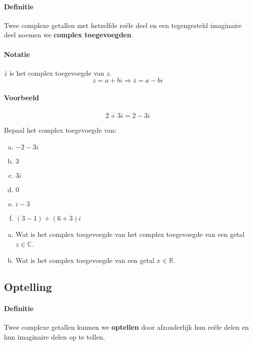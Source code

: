 \documentclass[12pt,twoside]{article}
\begin{document}
\paragraph*{Definitie}
\begin{mdframed}
Twee complexe getallen met hetzelfde reële deel en een tegengesteld imaginaire deel noemen we {\bf complex toegevoegden}.
\end{mdframed}

\paragraph*{Notatie}
$\bar{z}$ is het complex toegevoegde van $z$.
$$z=a+bi \Rightarrow \overline{z}=a-bi$$

\paragraph*{Voorbeeld}
$$\overline{2+3i}=2-3i$$

\begin{oefening}
Bepaal het complex toegevoegde van:
\begin{multicols}{2}
\begin{enumerate}[(a)]
  \item $-2-3i$
  \item $3$
  \item $3i$
  \item $0$
  \item $i-3$
  \item $(3-1)+(6+3)i$
\end{enumerate}  
\end{multicols}
\end{oefening}

\begin{oefening}
\begin{enumerate}[(a)]
  \item Wat is het complex toegevoegde van het complex toegevoegde van een getal $z\in\mathbb{C}$.
  \item Wat is het complex toegevoegde van een getal $x\in\mathbb{R}$.
\end{enumerate}

\end{oefening}

\subsection{Optelling}

\paragraph*{Definitie}
\begin{mdframed}
Twee complexe getallen kunnen we {\bf optellen} door afzonderlijk hun reële delen en hun imaginaire delen op te tellen.
\end{mdframed}
\end{document}

